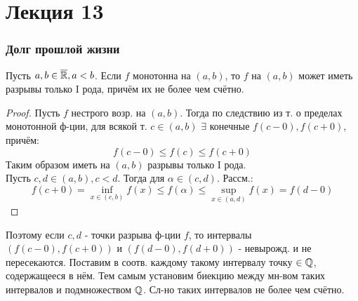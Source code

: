 \section{Лекция 13}
\subsubsection{Долг прошлой жизни}
\begin{theorem}
  \label{th:monot_div}
  Пусть $a, b \in \overline{\mathbb{R}}, a < b$. Если $f$ монотонна на $(a, b)$, то $f$ на $(a, b)$ может иметь разрывы только I рода, причём их не более чем счётно.
\end{theorem}
\begin{proof}
Пусть $f$ нестрого возр. на $(a, b)$. Тогда по следствию из т. о пределах монотонной ф-ции, для всякой т. $c \in (a, b)$ $\exists$ конечные $f(c - 0), f(c + 0)$, причём:
\[
  f(c - 0) \leq f(c) \leq f(c + 0)
\]
Таким образом иметь на $(a, b)$ разрывы только I рода. \\

Пусть $c, d \in (a, b), c < d$. Тогда для $\alpha \in (c, d)$. Рассм.:
\[
  f(c + 0) = \underset{x \in (c, b)}{\inf} f(x) \leq f(\alpha) \leq \underset{x \in (a, d)}{\sup} f(x) = f(d - 0)
\]
\end{proof}
Поэтому если $c, d$ - точки разрыва ф-ции $f$, то интервалы $(f(c - 0), f(c + 0))$ и $(f(d - 0), f(d + 0))$ - невырожд. и не пересекаются. Поставим в соотв. каждому такому интервалу точку $\in \mathbb{Q}$, содержащееся в нём. Тем самым установим биекцию между мн-вом таких интервалов и подмножеством $\mathbb{Q}$. Сл-но таких интервалов не более чем счётно.

